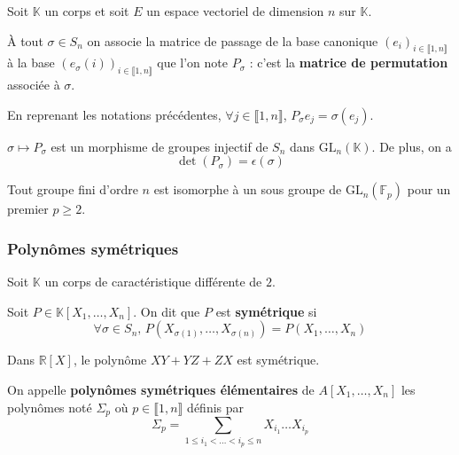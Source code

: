 
  Soit $\mathbb{K}$ un corps et soit $E$ un espace vectoriel de dimension $n$ sur $\mathbb{K}$.

  \begin{definition}
    À tout $\sigma \in S_n$ on associe la matrice de passage de la base canonique $(e_i)_{i \in \llbracket 1, n \rrbracket}$ à la base $(e_\sigma(i))_{i \in \llbracket 1, n \rrbracket}$ que l'on note $P_{\sigma}$ : c'est la \textbf{matrice de permutation} associée à $\sigma$.
  \end{definition}

  \begin{remark}
    En reprenant les notations précédentes, $\forall j \in \llbracket 1, n \rrbracket$, $P_{\sigma} e_j = \sigma(e_j)$.
  \end{remark}

  \begin{proposition}
    $\sigma \mapsto P_{\sigma}$ est un morphisme de groupes injectif de $S_n$ dans $\mathrm{GL}_n(\mathbb{K})$. De plus, on a
    \[ \det(P_{\sigma}) = \epsilon(\sigma) \]
  \end{proposition}

  \begin{corollary}
    Tout groupe fini d'ordre $n$ est isomorphe à un sous groupe de $\mathrm{GL}_n(\mathbb{F}_p)$ pour un premier $p \geq 2$.
  \end{corollary}

  \subsubsection{Polynômes symétriques}


  Soit $\mathbb{K}$ un corps de caractéristique différente de $2$.

  \begin{definition}
    Soit $P \in \mathbb{K}[X_1, \dots, X_n]$. On dit que $P$ est \textbf{symétrique} si
    \[ \forall \sigma \in S_n, \, P(X_{\sigma(1)}, \dots, X_{\sigma(n)}) = P(X_1, \dots, X_n) \]
  \end{definition}

  \begin{example}
    Dans $\mathbb{R}[X]$, le polynôme $XY + YZ + ZX$ est symétrique.
  \end{example}

  \begin{definition}
    On appelle \textbf{polynômes symétriques élémentaires} de $A[X_1, \dots, X_n]$ les polynômes noté $\Sigma_p$ où $p \in \llbracket 1, n \rrbracket$ définis par
    \[ \Sigma_p = \sum_{1 \leq i_1 < \dots < i_p \leq n} X_{i_1} \dots X_{i_p} \]
  \end{definition}

